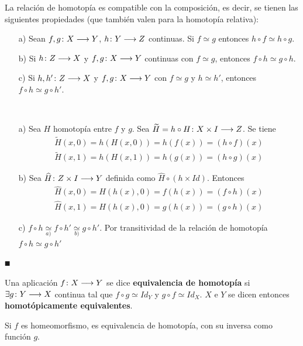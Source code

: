\documentclass[GTS.tex]{subfiles}
\begin{document}
\begin{lemma} La relación de homotopía es compatible con la composición, es decir, se tienen las siguientes propiedades (que también valen para la homotopía relativa):
\begin{enumerate}
\item[a)] Sean $f,g\colon{X}\longrightarrow{Y}$, $h\colon{Y}\longrightarrow{Z}$ continuas. Si $f\simeq g$ entonces $h\circ f\simeq h\circ g$.
\item[b)] Si $h\colon{Z}\longrightarrow{X}$ y $f,g\colon{X}\longrightarrow{Y}$ continuas con $f\simeq g$, entonces $f\circ h\simeq g\circ h$.
\item[c)] Si $h,h'\colon{Z}\longrightarrow{X}$ y $f,g\colon{X}\longrightarrow{Y}$ con $f\simeq g$ y $h\simeq h'$, entonces $f\circ h\simeq g\circ h'$.
\end{enumerate}
\end{lemma}
\begin{dem}\
\begin{enumerate}
\item[a)] Sea $H$ homotopía entre $f$ y $g$. Sea $\widetilde{H}=h\circ H\colon{X\times I}\longrightarrow{Z}$. Se tiene
\begin{gather*}
\widetilde{H}(x,0)=h(H(x,0))=h(f(x))=(h\circ f)(x)\\
\widetilde{H}(x,1)=h(H(x,1))=h(g(x))=(h\circ g)(x)
\end{gather*}
\item[b)] Sea $\widehat{H}\colon{Z\times I}\longrightarrow{Y}$ definida como $\widehat{H}\circ(h\times Id)$. Entonces
\begin{gather*}
\widehat{H}(x,0)=H(h(x),0)=f(h(x))=(f\circ h)(x)\\
\widehat{H}(x,1)=H(h(x),0)=g(h(x))=(g\circ h)(x)
\end{gather*}
\item[c)] $f\circ h\underset{a)}{\simeq}f\circ h'\underset{b)}{\simeq}g\circ h'$. Por transitividad de la relación de homotopía $f\circ h\simeq g\circ h'$
\end{enumerate}
$\QED$
\end{dem}

\begin{defi} Una aplicación $f\colon{X}\longrightarrow{Y}$ se dice \textbf{equivalencia de homotopía} si $\exists g\colon{Y}\longrightarrow{X}$ continua tal que $f\circ g\simeq Id_Y$ y $g\circ f\simeq Id_X$. $X$ e $Y$ se dicen entonces \textbf{homotópicamente equivalentes}.
\end{defi}

\begin{nota} Si $f$ es homeomorfismo, es equivalencia de homotopía, con su inversa como función $g$.
\end{nota}
\end{document}

